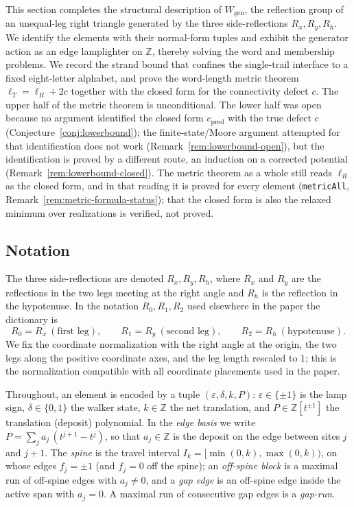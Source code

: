 \documentclass[11pt]{article}
\theoremstyle{plain}
\theoremstyle{definition}
\theoremstyle{remark}
\begin{document}
This section completes the structural description of $W_{\mathrm{gen}}$, the
reflection group of an unequal-leg right triangle generated by the three
side-reflections $R_x,R_y,R_h$. We identify the elements with their
normal-form tuples and exhibit the generator action as an edge lamplighter
on $\mathbb{Z}$, thereby solving the word and membership problems. We record the strand bound that confines the single-trail interface to a fixed
eight-letter alphabet, and prove the word-length metric theorem
$\ell_T = \ell_R + 2c$ together with the closed form for the connectivity
defect $c$. The upper half of the metric theorem is unconditional. The lower
half was open because no argument identified the closed form $c_{\mathrm{pred}}$
with the true defect $c$ (Conjecture~\ref{conj:lowerbound}); the
finite-state/Moore argument attempted for that identification does not work
(Remark~\ref{rem:lowerbound-open}), but the identification is proved by a
different route, an induction on a corrected potential
(Remark~\ref{rem:lowerbound-closed}). The metric theorem as a whole still
reads $\ell_R$ as the closed form, and in that reading it is proved for every
element (\texttt{metricAll}, Remark~\ref{rem:metric-formula-status}); that the
closed form is also the relaxed minimum over realizations is verified, not
proved.

\subsection{Notation}
\label{ssec:metric-notation}

The three side-reflections are denoted $R_x,R_y,R_h$, where $R_x$ and $R_y$ are
the reflections in the two legs meeting at the right angle and $R_h$ is the
reflection in the hypotenuse. In the notation $R_0,R_1,R_2$ used elsewhere in
the paper the dictionary is
\[
R_0=R_x\ (\text{first leg}),\qquad
R_1=R_y\ (\text{second leg}),\qquad
R_2=R_h\ (\text{hypotenuse}).
\]
We fix the coordinate normalization with the right angle at the origin, the two
legs along the positive coordinate axes, and the leg length rescaled to $1$;
this is the normalization compatible with all coordinate placements used in the
paper.

Throughout, an element is encoded by a tuple $(\varepsilon,\delta,k,P)$:
$\varepsilon\in\{\pm1\}$ is the lamp sign, $\delta\in\{0,1\}$ the walker
state, $k\in\mathbb{Z}$ the net translation, and $P\in\mathbb{Z}[t^{\pm1}]$
the translation (deposit) polynomial. In the \emph{edge basis} we write
$P=\sum_j a_j\,(t^{j+1}-t^j)$, so that $a_j\in\mathbb{Z}$ is the deposit on
the edge between sites $j$ and $j+1$. The \emph{spine} is the travel interval
$I_k=[\min(0,k),\max(0,k))$, on whose edges $f_j=\pm1$ (and $f_j=0$ off the
spine); an \emph{off-spine block} is a maximal run of off-spine edges with
$a_j\neq0$, and a \emph{gap edge} is an off-spine edge inside the active span
with $a_j=0$. A maximal run of consecutive gap edges is a \emph{gap-run}.
\end{document}
